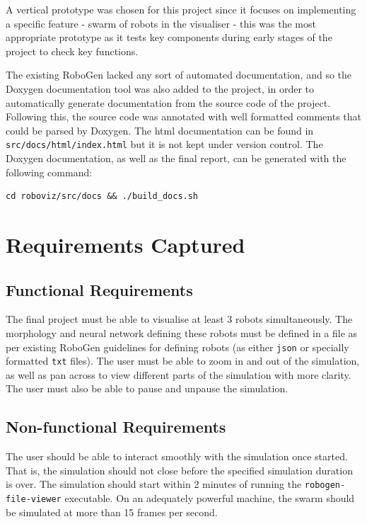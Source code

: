 \documentclass[11pt,a4paper]{article}
\begin{document}
A vertical prototype was chosen for this project since it focuses on
implementing a specific feature - swarm of robots in the visualiser - this was
the most appropriate prototype as it tests key components during early stages
of the project to check key functions.

The existing RoboGen \cite{robogen} lacked any sort of automated documentation,
and so the Doxygen documentation tool \cite{doxygen} was also added to the
project, in order to automatically generate documentation from the source code
of the project.  Following this, the source code was annotated with well
formatted comments that could be parsed by Doxygen. The html documentation can
be found in \texttt{src/docs/html/index.html} but it is not kept under version
control. The Doxygen documentation, as well as the final report, can be
generated with the following command:

\begin{verbatim}
cd roboviz/src/docs && ./build_docs.sh
\end{verbatim}

\section{Requirements Captured}

\subsection{Functional Requirements}
The final project must be able to visualise at least 3 robots simultaneously.
The morphology and neural network defining these robots must be defined in a
file as per existing RoboGen guidelines for defining robots (as either
\texttt{json} or specially formatted \texttt{txt} files). The user must be able
to zoom in and out of the simulation, as well as pan across to view different
parts of the simulation with more clarity. The user must also be able to pause
and unpause the simulation.

\subsection{Non-functional Requirements}
The user should be able to interact smoothly with the simulation once started.
That is, the simulation should not close before the specified simulation
duration is over. The simulation should start within 2 minutes of running the
\texttt{robogen-file-viewer} executable. On an adequately powerful machine, the
swarm should be simulated at more than 15 frames per second.
\end{document}
